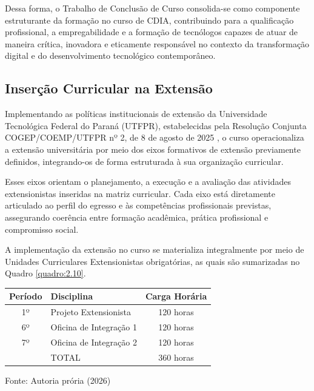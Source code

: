 Dessa forma, o Trabalho de Conclusão de Curso consolida-se como componente estruturante da formação no curso de CDIA, contribuindo para a qualificação profissional, a empregabilidade e a formação de tecnólogos capazes de atuar de maneira crítica, inovadora e eticamente responsável no contexto da transformação digital e do desenvolvimento tecnológico contemporâneo.

\subsection{Inserção Curricular na Extensão}

Implementando as políticas institucionais de extensão da Universidade Tecnológica Federal do Paraná (UTFPR), estabelecidas pela Resolução Conjunta COGEP/COEMP/UTFPR nº 2, de 8 de agosto de 2025 \cite{UTFPR_EXT_2022}, o curso operacionaliza a extensão universitária por meio dos eixos formativos de extensão previamente definidos, integrando-os de forma estruturada à sua organização curricular.

Esses eixos orientam o planejamento, a execução e a avaliação das atividades extensionistas inseridas na matriz curricular. Cada eixo está diretamente articulado ao perfil do egresso e às competências profissionais previstas, assegurando coerência entre formação acadêmica, prática profissional e compromisso social.

A implementação da extensão no curso se materializa integralmente por meio de Unidades Curriculares Extensionistas obrigatórias, as quais são sumarizadas no Quadro \ref{quadro:2.10}.

\begin{quadro}[htb]
    \centering
    \caption{Unidades Curriculares de extensão}
    \label{quadro:2.10}
    \begin{tabular}{|c|l|c|}
        \hline
        \textbf{Período} & \textbf{Disciplina} & \textbf{Carga Horária} \\ \hline
        1º & Projeto Extensionista & 120 horas \\ \hline
        6º & Oficina de Integração 1 & 120 horas \\ \hline
        7º & Oficina de Integração 2 & 120 horas \\ \hline
        & TOTAL & 360 horas \\ \hline
    \end{tabular}
    
    \vspace{1ex}
    \small Fonte: Autoria prória (2026)
\end{quadro}

